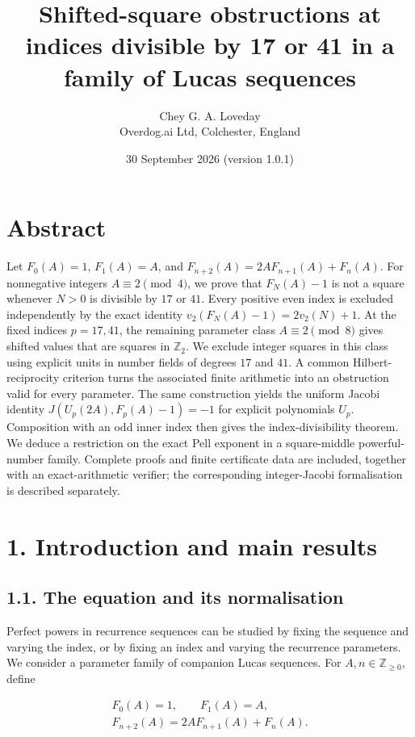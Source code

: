 \documentclass[11pt,a4paper]{article}
\title{Shifted-square obstructions at indices divisible by 17 or 41 in a
family of Lucas sequences}
\author{Chey G. A. Loveday\\[3pt]{\normalsize Overdog.ai Ltd,
Colchester, England}}
\date{30 September 2026 (version 1.0.1)}
\makeatletter
\renewcommand{\maketitle}{%
  \begin{center}
  {\LARGE\bfseries\@title\par}\vspace{12pt}
  {\large\@author\par}\vspace{7pt}
  {\normalsize\@date\par}
  \end{center}\vspace{7pt}}
\makeatother
\begin{document}
\maketitle
\section{Abstract}\label{abstract}

Let \(F_0(A)=1\), \(F_1(A)=A\), and \(F_{n+2}(A)=2AF_{n+1}(A)+F_n(A)\).
For nonnegative integers \(A\equiv2\pmod4\), we prove that \(F_N(A)-1\)
is not a square whenever \(N>0\) is divisible by \(17\) or \(41\). Every
positive even index is excluded independently by the exact identity
\(v_2(F_N(A)-1)=2v_2(N)+1\). At the fixed indices \(p=17,41\), the
remaining parameter class \(A\equiv2\pmod8\) gives shifted values that
are squares in \(\mathbb Z_2\). We exclude integer squares in this class
using explicit units in number fields of degrees \(17\) and \(41\). A
common Hilbert-reciprocity criterion turns the associated finite
arithmetic into an obstruction valid for every parameter. The same
construction yields the uniform Jacobi identity
\(J(U_p(2A),F_p(A)-1)=-1\) for explicit polynomials \(U_p\). Composition
with an odd inner index then gives the index-divisibility theorem. We
deduce a restriction on the exact Pell exponent in a square-middle
powerful-number family. Complete proofs and finite certificate data are
included, together with an exact-arithmetic verifier; the corresponding
integer-Jacobi formalisation is described separately.

\section{1. Introduction and main results}\label{introduction}

\subsection{1.1. The equation and its normalisation}\label{problem}

Perfect powers in recurrence sequences can be studied by fixing the
sequence and varying the index, or by fixing an index and varying the
recurrence parameters. We consider a parameter family of companion Lucas
sequences. For \(A,n\in\mathbb Z_{\ge0}\), define

\[
\begin{gathered}
F_0(A)=1,\qquad F_1(A)=A,\\
F_{n+2}(A)=2AF_{n+1}(A)+F_n(A).
\end{gathered}
\tag{1.1}
\]
\end{document}
